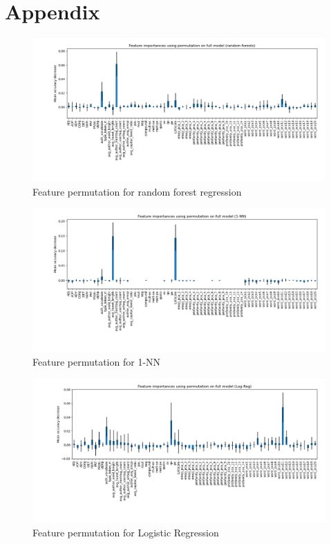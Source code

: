 \onecolumn
\section*{Appendix}\label{sec:appendix}

\begin{figure}[!h]
    \centering
    \includegraphics[width = \textwidth]{images/feature_importance_rf.png}
    \caption{Feature permutation for random forest regression}
    \label{fig:fi_rf}
\end{figure}

\vspace{0.1cm}

\begin{figure}[!h]
         \centering
         \includegraphics[width=\textwidth]{images/feature_importance_1NN.png}
         \caption{Feature permutation for 1-NN}
         \label{fig:fi_1NN}
\end{figure}

\vspace{0.1cm}

\begin{figure}
         \centering
         \includegraphics[width=\textwidth]{images/feature_importance_logreg.png}
         \caption{Feature permutation for Logistic Regression}
         \label{fig:fi_logreg}
     \end{figure}
     
